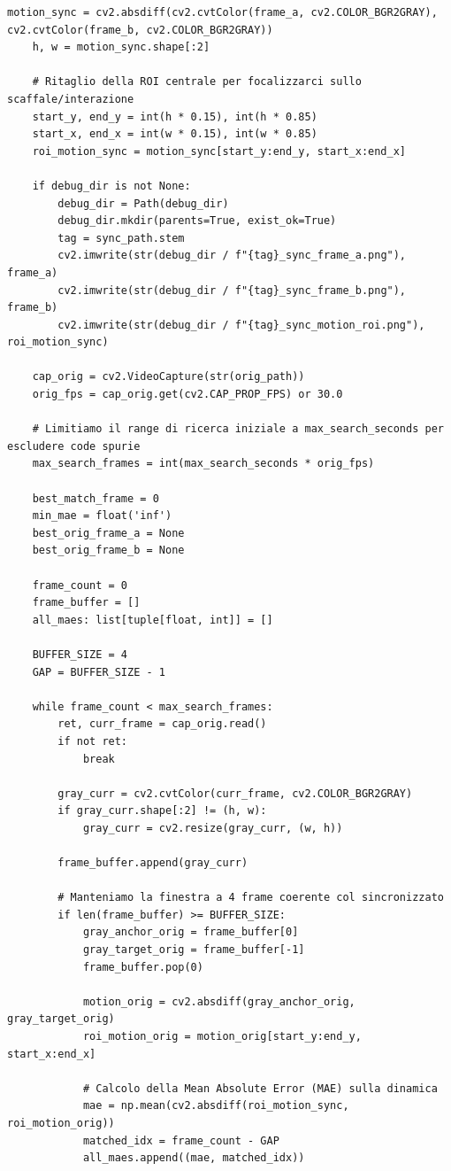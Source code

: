 \begin{lstlisting}[style=pythonstyle, caption={Estrazione del ground truth temporale tramite matching della dinamica}, label={lst:dynamic_between_two_frame}]
    motion_sync = cv2.absdiff(cv2.cvtColor(frame_a, cv2.COLOR_BGR2GRAY), cv2.cvtColor(frame_b, cv2.COLOR_BGR2GRAY))
    h, w = motion_sync.shape[:2]

    # Ritaglio della ROI centrale per focalizzarci sullo scaffale/interazione
    start_y, end_y = int(h * 0.15), int(h * 0.85)
    start_x, end_x = int(w * 0.15), int(w * 0.85)
    roi_motion_sync = motion_sync[start_y:end_y, start_x:end_x]

    if debug_dir is not None:
        debug_dir = Path(debug_dir)
        debug_dir.mkdir(parents=True, exist_ok=True)
        tag = sync_path.stem
        cv2.imwrite(str(debug_dir / f"{tag}_sync_frame_a.png"), frame_a)
        cv2.imwrite(str(debug_dir / f"{tag}_sync_frame_b.png"), frame_b)
        cv2.imwrite(str(debug_dir / f"{tag}_sync_motion_roi.png"), roi_motion_sync)

    cap_orig = cv2.VideoCapture(str(orig_path))
    orig_fps = cap_orig.get(cv2.CAP_PROP_FPS) or 30.0

    # Limitiamo il range di ricerca iniziale a max_search_seconds per escludere code spurie
    max_search_frames = int(max_search_seconds * orig_fps)

    best_match_frame = 0
    min_mae = float('inf')
    best_orig_frame_a = None
    best_orig_frame_b = None

    frame_count = 0
    frame_buffer = []
    all_maes: list[tuple[float, int]] = []

    BUFFER_SIZE = 4
    GAP = BUFFER_SIZE - 1

    while frame_count < max_search_frames:
        ret, curr_frame = cap_orig.read()
        if not ret:
            break

        gray_curr = cv2.cvtColor(curr_frame, cv2.COLOR_BGR2GRAY)
        if gray_curr.shape[:2] != (h, w):
            gray_curr = cv2.resize(gray_curr, (w, h))

        frame_buffer.append(gray_curr)

        # Manteniamo la finestra a 4 frame coerente col sincronizzato
        if len(frame_buffer) >= BUFFER_SIZE:
            gray_anchor_orig = frame_buffer[0]
            gray_target_orig = frame_buffer[-1]
            frame_buffer.pop(0)

            motion_orig = cv2.absdiff(gray_anchor_orig, gray_target_orig)
            roi_motion_orig = motion_orig[start_y:end_y, start_x:end_x]

            # Calcolo della Mean Absolute Error (MAE) sulla dinamica 
            mae = np.mean(cv2.absdiff(roi_motion_sync, roi_motion_orig))
            matched_idx = frame_count - GAP
            all_maes.append((mae, matched_idx))


\end{lstlisting}

